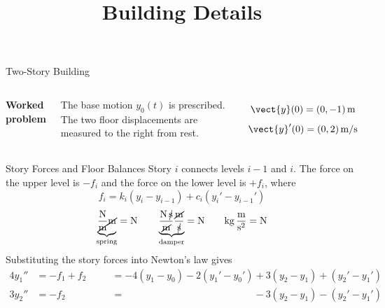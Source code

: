 \documentclass[11pt,aspectratio=169]{beamer}
\title{Building Details}
\date{}
\begin{document}
\begin{frame}{Two-Story Building}
\begin{columns}[c,onlytextwidth]
  \resizebox{\linewidth}{!}{\TwoStoryBuilding{}}
  \textbf{Worked problem}

  \medskip
  The base motion $y_0(t)$ is prescribed. The two floor displacements are
  measured to the right from rest.

  \[
    \vect{y}(0)=(0,-1)\,\mathrm{m}
  \]
  \[
    \vect{y}'(0)=(0,2)\,\mathrm{m/s}
  \]
\end{columns}
\end{frame}

\begin{frame}{Story Forces and Floor Balances}
\setlength{\abovedisplayskip}{5pt}
\setlength{\belowdisplayskip}{5pt}
\setlength{\abovedisplayshortskip}{5pt}
\setlength{\belowdisplayshortskip}{5pt}
Story $i$ connects levels $i-1$ and $i$. The force on the 
upper level is
$-f_i$ and the force on the lower level is $+f_i$, where
\[
  f_i=k_i(y_i-y_{i-1})+c_i(y_i'-y_{i-1}')
\]
\[
  \underbrace{\frac{\mathrm{N}}{\cancel{\mathrm{m}}}
    \cancel{\mathrm{m}}}_{\text{spring}}=\mathrm{N}
  \qquad
  \underbrace{\frac{\mathrm{N}\,\cancel{\mathrm{s}}}{\cancel{\mathrm{m}}}
    \frac{\cancel{\mathrm{m}}}{\cancel{\mathrm{s}}}}_{\text{damper}}=\mathrm{N}
  \qquad
  \mathrm{kg}\,\frac{\mathrm{m}}{\mathrm{s}^2}=\mathrm{N}
\]
Substituting the story forces into Newton's law gives
\[
  \begin{alignedat}{2}
    4y_1'' &=-f_1+f_2 &\quad
      &=-4(y_1-y_0)-2(y_1'-y_0')+3(y_2-y_1)+(y_2'-y_1')\\
    3y_2'' &=-f_2 &
      &=\phantom{-4(y_1-y_0)-2(y_1'-y_0')}-3(y_2-y_1)-(y_2'-y_1')
  \end{alignedat}
\]
\end{frame}
\end{document}
